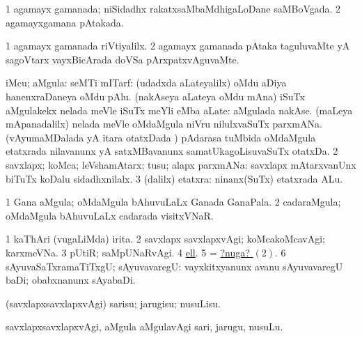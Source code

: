 \bentry
{}
\gl{\gu}
\bmng
\bnum
\num{1} agamayx gamanada; niSidadhx rakatxsaMbaMdhigaLoDane saMBoVgada. 
\num{2} agamayxgamana pAtakada. 
\enum
\emng
\eentry

\bentry
{}
\gl{\kirxvi}
\bmng
\bnum
\num{1} agamayx gamanada riVtiyalilx. 
\num{2} agamayx gamanada pAtaka taguluvaMte yA sagoVtarx vayxBicArada doVSa pArxpatxvAguvaMte. 
\enum
\emng
\eentry

\bentry
{}
\gl{\nA}
\bmng
\bnum
{} iMcu; aMgula: 
\banum
{}  seMTi mITarf: (udadxda aLateyalilx) oMdu aDiya hanenxraDaneya oMdu pAlu. 
 (nakAseya aLateya oMdu mAna) iSuTx aMgulakekx nelada meVle iSuTx meYli eMba aLate:     aMgulada nakAse. 
 (maLeya mApanadalilx) nelada meVle oMdaMgula niVru nilulxvaSuTx parxmANa. 
 (vAyumaMDalada yA itara otatxDada \vi) pAdarasa tuMbida oMdaMgula etatxrada nilavanunx yA satxMBavanunx samatUkagoLisuvaSuTx otatxDa. 
\eanum
\numie
\num{2} savxlapx; koMca; leVshamAtarx; tusu; alapx parxmANa:  savxlapx mAtarxvanUnx biTuTx koDalu sidadhxnilalx. 
\num{3} (\bava dalilx) etatxra:  ninanx(SuTx) etatxrada ALu. 
\enum
\emng

\noindent
\gl{\pagu}
\bmng
\bnum
\num{1}  Gana aMgula; oMdaMgula bAhuvuLaLx Ganada GanaPala. 
\num{2}  cadaraMgula; oMdaMgula bAhuvuLaLx cadarada visitxVNaR. 
\enum
\emng

\noindent
\gl{\nuga}
\bmng
\bnum
\num{1}  kaThAri (\mo vugaLiMda) irita. 
\hypertarget{inch nuga2}{} 
\num{2}  savxlapx savxlapxvAgi; koMcakoMcavAgi; karxmeVNa. 
\num{3}  pUtiR; saMpUNaRvAgi. 
\num{4}  \hyperref{kandict_e.pdf}{E}{ell nuga}{ell}. 
\num{5}  = \hyperlink{inch nuga2}{?nuga? \((2)\)}. 
\num{6}  sAyuvaSaTxramaTiTxgU; sAyuvavaregU:  vayxkitxyanunx avanu sAyuvavaregU baDi; obabxnanunx sAyabaDi. 
\enum
\emng
\eentry

\bentry
{}
\gl{\sakirx}
\bmng
(savxlapxsavxlapxvAgi) sarisu; jarugisu; nusuLisu. 
\emng

\noindent
\gl{\akirx}
\bmng
savxlapxsavxlapxvAgi, aMgula aMgulavAgi sari, jarugu, nusuLu. 
\emng
\eentry

